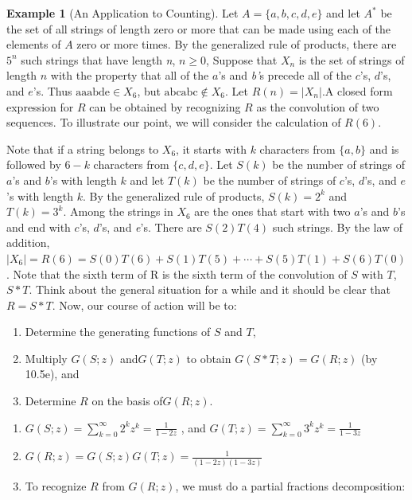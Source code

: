 \documentclass[10pt,]{book}
\theoremstyle{plain}
\theoremstyle{definition}
\theoremstyle{definition}
\theoremstyle{definition}
\newtheorem{example}[theorem]{Example}
\theoremstyle{definition}
\numberwithin{equation}{section}
\begin{document}
\begin{example}[An Application to Counting]\label{example-counting-application}
 Let \(A = \{a, b, c, d, e\}\) and let \(A^*\) be the set of all strings of length zero or more that can be made using each of the elements of \(A\) zero or more times. By the generalized rule of products, there are \(5^n\) such strings that have length \textit{
n}, \(n\geq 0\), Suppose that \(X_n\) is the set of strings of length \(n\) with the property that all of the \(a\)'s and \textit{ b'}s precede all of the \(c\)'s, \(d\)'s, and \(e\)'s. Thus \(\text{aaabde} \in  X_6\), but \(\text{abcabc} \notin  X_6\). Let \(R(n)
=\lvert X_n\rvert \).A closed form expression for \(R\) can be obtained by recognizing \(R\) as the convolution of two sequences.
To illustrate our point, we will consider the calculation of \(R(6)\).%
\par
Note that if a string belongs to \(X_6\), it starts with \(k\) characters from \(\{a, b\}\) and is followed by \(6 - k\) characters from \(\{c,
d, e\}\). Let \(S(k)\) be the number of strings of \(a\)'s and \(b\)'s with length \(k\) and let \(T(k)\) be the number of strings
of \(c\)'s, \(d\)'s, and \(e\)'s with length \(k\). By the generalized rule of products, \(S(k) = 2^k\) and \(T(k) = 3^k\).
Among the strings in \(X_6\) are the ones that start with two \(a\)'s and \(b\)'s and end with \(c\)'s, \(d\)'s, and \textit{
e}'s. There are \(S(2)T(4)\) such strings. By the law of addition, \(\left.\lvert X_6\rvert  =R(6)=S(0)T(6)+S(1)T(5)+\cdots +S(5)T(1)+S(6)T(0)\).
Note that the sixth term of R is the sixth term of the convolution of \(S\) with \(T\), \(S*T\). Think about the general situation for
a while and it should be clear that \(R =S*T\). Now, our course of action will be to:%
\par
\leavevmode%
\begin{enumerate}[label=\alph*]
\item\hypertarget{li-102}{}Determine the generating functions of \(S\) and \(T\),%
\item\hypertarget{li-103}{}Multiply \(G(S;z)\) and\(G(T;z)\) to obtain \(G(S*T;z) = G(R;z)\) (by 10.5e), and%
\item\hypertarget{li-104}{}Determine \(R\) on the basis of\(G(R;z)\).%
\end{enumerate}
%
\par
\leavevmode%
\begin{enumerate}[label=\alph*]
\item\hypertarget{li-105}{}\(G(S;z) =\sum_{k=0}^{\infty} 2^k z^k=\frac{1}{1-2z}\) , and \(G(T;z) =\sum_{k=0}^{\infty} 3^k z^k=\frac{1}{1-3z}\)%
\item\hypertarget{li-106}{} \(G(R;z) = G(S;z)G(T;z) = \frac{1}{(1-2z)(1-3z)}\)%
\item\hypertarget{li-107}{}To recognize \(R\) from \(G(R;z)\), we must do a partial fractions decomposition:




\end{enumerate}
\end{example}
\end{document}
